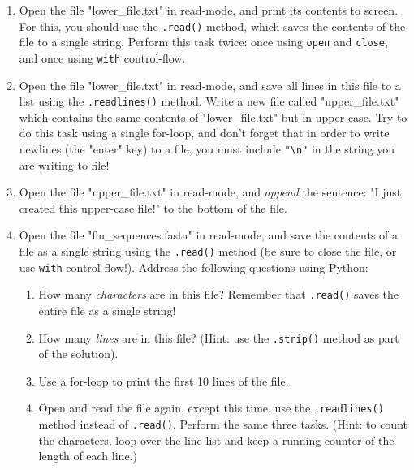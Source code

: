 \documentclass{article}[12pt]
\newcommand{\code}[1]{\texttt{#1}}  %
\begin{document}
\begin{enumerate}[itemsep=5ex]
	
	\item Open the file "lower\_file.txt" in read-mode, and print its contents to screen. For this, you should use the \code{.read()} method, which saves the contents of the file to a single string. Perform this task twice: once using \code{open} and \code{close}, and once using \code{with} control-flow.
	
	\item Open the file "lower\_file.txt" in read-mode, and save all lines in this file to a list using the \code{.readlines()} method. Write a new file called "upper\_file.txt" which contains the same contents of "lower\_file.txt" but in upper-case. Try to do this task using a single for-loop, and don't forget that in order to write newlines (the "enter" key) to a file, you must include \code{"\textbackslash n"} in the string you are writing to file!
	
	\item Open the file "upper\_file.txt" in read-mode, and \emph{append} the sentence: "I just created this upper-case file!" to the bottom of the file. 
	
	\item Open the file "flu\_sequences.fasta" in read-mode, and save the contents of a file as a single string using the \code{.read()} method (be sure to close the file, or use \code{with} control-flow!). Address the following questions using Python:
	
	\begin{enumerate}[itemsep=2ex]
		\item How many \emph{characters} are in this file? Remember that \code{.read()} saves the entire file as a single string!
		\item How many \emph{lines} are in this file? (Hint: use the \code{.strip()} method as part of the solution).
		\item Use a for-loop to print the first 10 lines of the file.
		\item Open and read the file again, except this time, use the \code{.readlines()} method instead of \code{.read()}. Perform the same three tasks. (Hint: to count the characters, loop over the line list and keep a running counter of the length of each line.)
	\end{enumerate}
\end{enumerate}
\end{document}
